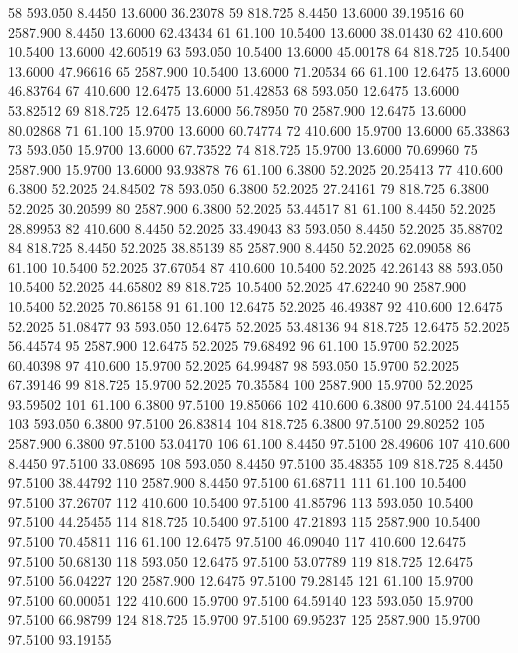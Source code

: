\begin{Schunk}
\begin{Soutput}
58   593.050    8.4450 13.6000 36.23078
59   818.725    8.4450 13.6000 39.19516
60  2587.900    8.4450 13.6000 62.43434
61    61.100   10.5400 13.6000 38.01430
62   410.600   10.5400 13.6000 42.60519
63   593.050   10.5400 13.6000 45.00178
64   818.725   10.5400 13.6000 47.96616
65  2587.900   10.5400 13.6000 71.20534
66    61.100   12.6475 13.6000 46.83764
67   410.600   12.6475 13.6000 51.42853
68   593.050   12.6475 13.6000 53.82512
69   818.725   12.6475 13.6000 56.78950
70  2587.900   12.6475 13.6000 80.02868
71    61.100   15.9700 13.6000 60.74774
72   410.600   15.9700 13.6000 65.33863
73   593.050   15.9700 13.6000 67.73522
74   818.725   15.9700 13.6000 70.69960
75  2587.900   15.9700 13.6000 93.93878
76    61.100    6.3800 52.2025 20.25413
77   410.600    6.3800 52.2025 24.84502
78   593.050    6.3800 52.2025 27.24161
79   818.725    6.3800 52.2025 30.20599
80  2587.900    6.3800 52.2025 53.44517
81    61.100    8.4450 52.2025 28.89953
82   410.600    8.4450 52.2025 33.49043
83   593.050    8.4450 52.2025 35.88702
84   818.725    8.4450 52.2025 38.85139
85  2587.900    8.4450 52.2025 62.09058
86    61.100   10.5400 52.2025 37.67054
87   410.600   10.5400 52.2025 42.26143
88   593.050   10.5400 52.2025 44.65802
89   818.725   10.5400 52.2025 47.62240
90  2587.900   10.5400 52.2025 70.86158
91    61.100   12.6475 52.2025 46.49387
92   410.600   12.6475 52.2025 51.08477
93   593.050   12.6475 52.2025 53.48136
94   818.725   12.6475 52.2025 56.44574
95  2587.900   12.6475 52.2025 79.68492
96    61.100   15.9700 52.2025 60.40398
97   410.600   15.9700 52.2025 64.99487
98   593.050   15.9700 52.2025 67.39146
99   818.725   15.9700 52.2025 70.35584
100 2587.900   15.9700 52.2025 93.59502
101   61.100    6.3800 97.5100 19.85066
102  410.600    6.3800 97.5100 24.44155
103  593.050    6.3800 97.5100 26.83814
104  818.725    6.3800 97.5100 29.80252
105 2587.900    6.3800 97.5100 53.04170
106   61.100    8.4450 97.5100 28.49606
107  410.600    8.4450 97.5100 33.08695
108  593.050    8.4450 97.5100 35.48355
109  818.725    8.4450 97.5100 38.44792
110 2587.900    8.4450 97.5100 61.68711
111   61.100   10.5400 97.5100 37.26707
112  410.600   10.5400 97.5100 41.85796
113  593.050   10.5400 97.5100 44.25455
114  818.725   10.5400 97.5100 47.21893
115 2587.900   10.5400 97.5100 70.45811
116   61.100   12.6475 97.5100 46.09040
117  410.600   12.6475 97.5100 50.68130
118  593.050   12.6475 97.5100 53.07789
119  818.725   12.6475 97.5100 56.04227
120 2587.900   12.6475 97.5100 79.28145
121   61.100   15.9700 97.5100 60.00051
122  410.600   15.9700 97.5100 64.59140
123  593.050   15.9700 97.5100 66.98799
124  818.725   15.9700 97.5100 69.95237
125 2587.900   15.9700 97.5100 93.19155
\end{Soutput}
\end{Schunk}
